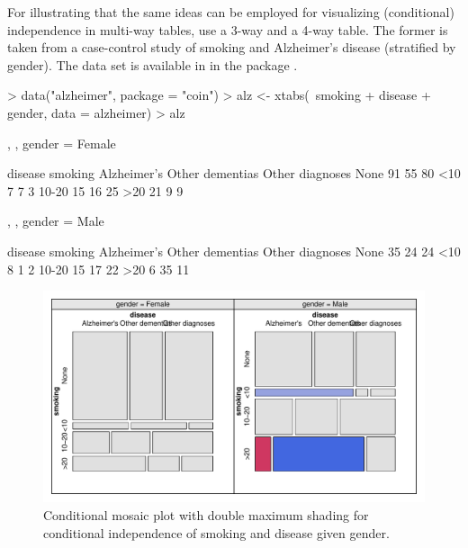 \documentclass{Z}
\begin{document}
For illustrating that the same ideas can be employed for visualizing (conditional)
independence in multi-way tables, \cite{vcd:Zeileis+Meyer+Hornik:2005} use a
3-way and a 4-way table. The former is taken from a case-control study of smoking
and {A}lzheimer's disease (stratified by gender). The data set is available in 
in the package  \cite{vcd:Hothorn+Hornik+VanDeWiel:2006}.

\begin{Schunk}
\begin{Sinput}
> data("alzheimer", package = "coin")
> alz <- xtabs(~smoking + disease + gender, data = alzheimer)
> alz
\end{Sinput}
\begin{Soutput}
, , gender = Female

       disease
smoking Alzheimer's Other dementias Other diagnoses
  None           91              55              80
  <10             7               7               3
  10-20          15              16              25
  >20            21               9               9

, , gender = Male

       disease
smoking Alzheimer's Other dementias Other diagnoses
  None           35              24              24
  <10             8               1               2
  10-20          15              17              22
  >20             6              35              11
\end{Soutput}
\end{Schunk}

\begin{figure}[b!]
\begin{center}
\includegraphics{residual-shadings-alzheimer-plot1}
\caption{Conditional mosaic plot with double maximum shading for conditional
independence of smoking and disease given gender.}
\label{fig:alz}
\end{center}
\end{figure}
\end{document}
